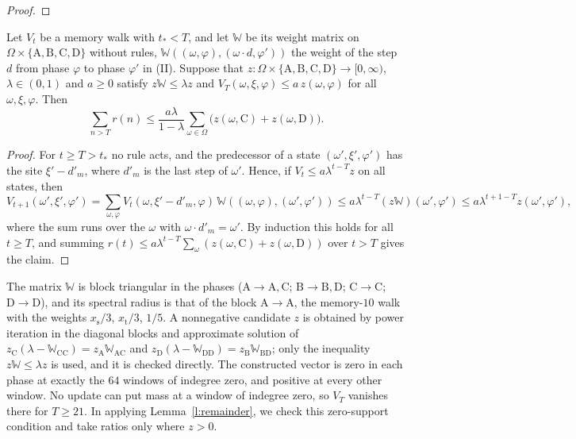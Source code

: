 \begin{proof}
\end{proof}

\begin{lemma}\label{l:remainder}
Let $V_t$ be a memory walk with $t_* < T$, and let $\mathbb W$ be its weight matrix on $\Omega \times \{\mathrm A, \mathrm B, \mathrm C, \mathrm D\}$ without rules, $\mathbb W((\omega, \varphi), (\omega \cdot d, \varphi'))$ the weight of the step $d$ from phase $\varphi$ to phase $\varphi'$ in (II). Suppose that $z \colon \Omega \times \{\mathrm A, \mathrm B, \mathrm C, \mathrm D\} \to [0, \infty)$, $\lambda \in (0, 1)$ and $a \ge 0$ satisfy $z \mathbb W \le \lambda z$ and $V_T(\omega, \xi, \varphi) \le a \, z(\omega, \varphi)$ for all $\omega, \xi, \varphi$. Then
\begin{equation*}
\sum_{n > T} r(n) \le \frac{a \lambda}{1 - \lambda} \sum_{\omega \in \Omega} \bigl( z(\omega, \mathrm C) + z(\omega, \mathrm D) \bigr).
\end{equation*}
\end{lemma}

\begin{proof}
For $t \ge T > t_*$ no rule acts, and the predecessor of a state $(\omega', \xi', \varphi')$ has the site $\xi' - d'_m$, where $d'_m$ is the last step of $\omega'$. Hence, if $V_t \le a \lambda^{t - T} z$ on all states, then
\begin{equation*}
V_{t + 1}(\omega', \xi', \varphi') = \sum_{\omega, \varphi} V_t(\omega, \xi' - d'_m, \varphi) \, \mathbb W((\omega, \varphi), (\omega', \varphi')) \le a \lambda^{t - T} (z \mathbb W)(\omega', \varphi') \le a \lambda^{t + 1 - T} z(\omega', \varphi'),
\end{equation*}
where the sum runs over the $\omega$ with $\omega \cdot d'_m = \omega'$. By induction this holds for all $t \ge T$, and summing $r(t) \le a \lambda^{t - T} \sum_\omega (z(\omega, \mathrm C) + z(\omega, \mathrm D))$ over $t > T$ gives the claim.
\end{proof}

The matrix $\mathbb W$ is block triangular in the phases ($\mathrm A \to \mathrm A, \mathrm C$; $\mathrm B \to \mathrm B, \mathrm D$; $\mathrm C \to \mathrm C$; $\mathrm D \to \mathrm D$), and its spectral radius is that of the block $\mathrm A \to \mathrm A$, the memory-$10$ walk with the weights $x_{\mathrm s}/3$, $x_{\mathrm t}/3$, $1/5$. A nonnegative candidate $z$ is obtained by power iteration in the diagonal blocks and approximate solution of
$z_{\mathrm C}(\lambda-\mathbb W_{\mathrm{CC}})=z_{\mathrm A}\mathbb W_{\mathrm{AC}}$ and
$z_{\mathrm D}(\lambda-\mathbb W_{\mathrm{DD}})=z_{\mathrm B}\mathbb W_{\mathrm{BD}}$;
only the inequality $z\mathbb W\le\lambda z$ is used, and it is checked directly.
The constructed vector is zero in each phase at exactly the $64$ windows of indegree zero, and positive at every other window.
No update can put mass at a window of indegree zero, so $V_T$ vanishes there for $T\ge21$.
In applying Lemma~\ref{l:remainder}, we check this zero-support condition and take ratios only where $z>0$.

